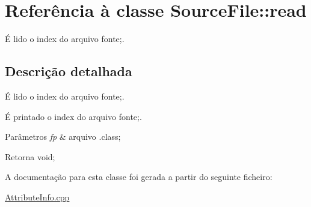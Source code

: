 \hypertarget{class_source_file_1_1read}{}\section{Referência à classe Source\+File\+:\+:read}
\label{class_source_file_1_1read}


É lido o index do arquivo fonte;.  




\subsection{Descrição detalhada}
É lido o index do arquivo fonte;. 

É printado o index do arquivo fonte;.


\begin{DoxyParams}{Parâmetros}
{\em fp} & arquivo .class; \\
\hline
\end{DoxyParams}
\begin{DoxyReturn}{Retorna}
void; 
\end{DoxyReturn}


A documentação para esta classe foi gerada a partir do seguinte ficheiro\+:\begin{DoxyCompactItemize}
\item 
\hyperlink{_attribute_info_8cpp}{Attribute\+Info.\+cpp}\end{DoxyCompactItemize}
